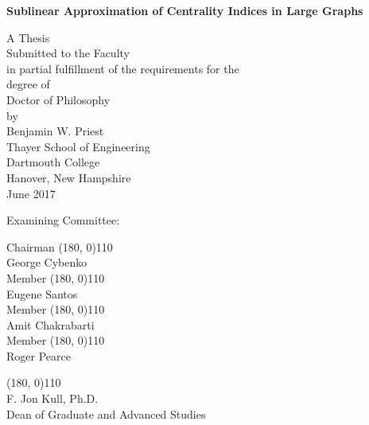 \documentclass{report}
\begin{document}

\begin{center}
\textbf{Sublinear Approximation of Centrality Indices in Large Graphs}
\vspace{0.4cm}

A Thesis \\
Submitted to the Faculty \\
in partial fulfillment of the requirements for the \\
degree of \\[0.4cm]
Doctor of Philosophy \\[0.4cm]
by\\[0.5cm]
Benjamin W. Priest\\[0.4cm]
Thayer School of Engineering \\
Dartmouth College \\
Hanover, New Hampshire \\[0.4cm]
June 2017 
\vspace{0.5cm}

\end{center}

Examining Committee:

\begin{flushright}
Chairman \line(180, 0){110} \\
George Cybenko\\[1cm]

Member \line(180, 0){110} \\
Eugene Santos\\[1cm]

Member \line(180, 0){110} \\
Amit Chakrabarti \\[1cm]

Member \line(180, 0){110} \\
Roger Pearce\\[1cm]


\end{flushright}

\begin{flushleft}
\line(180, 0){110} \\
F. Jon Kull, Ph.D.\\
Dean of Graduate and Advanced Studies\\[1cm]
\end{flushleft}
\end{document}
